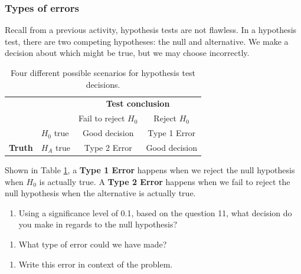 \documentclass[
]{report}
\providecommand{\tightlist}{%
  \setlength{\itemsep}{0pt}\setlength{\parskip}{0pt}}
\begin{document}
\hypertarget{types-of-errors}{%
\subsubsection*{Types of errors}\label{types-of-errors}}

Recall from a previous activity, hypothesis tests are not flawless. In a hypothesis test, there are two competing hypotheses: the null and alternative. We make a decision about which might be true, but we may choose incorrectly.

\begin{table}
\caption{Four different possible scenarios for hypothesis test decisions.}
\centering
\begin{tabular}[h]{ll|cc}
\hline
 & &  \multicolumn{2}{c}{\textbf{Test conclusion}} \\
 &  & \multicolumn{1}{c}{Fail to reject $H_0$} & \multicolumn{1}{c}{Reject $H_0$}\\
\hline
 & $H_0$ true & Good decision & Type 1 Error\\
\hline
\textbf{Truth} & $H_A$ true & Type 2 Error & Good decision\\
\hline
\end{tabular}
\label{tab:errors}
\end{table}

Shown in Table \ref{tab:errors}, a \textbf{Type 1 Error} happens when we reject the null hypothesis when \(H_0\) is actually true. A \textbf{Type 2 Error} happens when we fail to reject the null hypothesis when the alternative is actually true.

\begin{enumerate}
\def\labelenumi{\arabic{enumi}.}
\setcounter{enumi}{13}
\tightlist
\item
  Using a significance level of 0.1, based on the question 11, what decision do you make in regards to the null hypothesis?
\end{enumerate}

\vspace{0.3in}

\begin{enumerate}
\def\labelenumi{\arabic{enumi}.}
\setcounter{enumi}{14}
\tightlist
\item
  What type of error could we have made?
\end{enumerate}

\vspace{0.3in}

\begin{enumerate}
\def\labelenumi{\arabic{enumi}.}
\setcounter{enumi}{15}
\tightlist
\item
  Write this error in context of the problem.
\end{enumerate}
\end{document}

